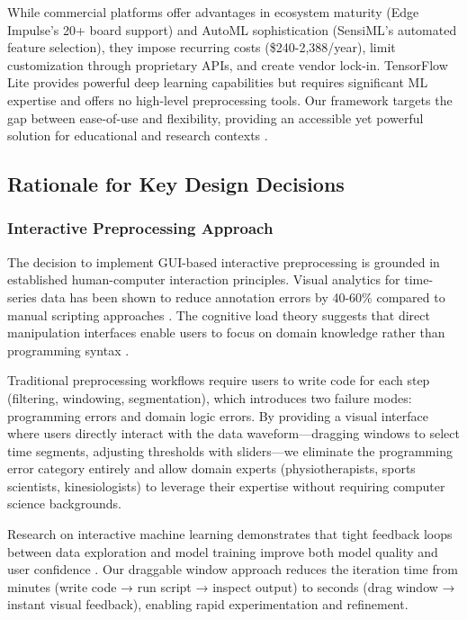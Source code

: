 While commercial platforms offer advantages in ecosystem maturity (Edge Impulse's 20+ board support) and AutoML sophistication (SensiML's automated feature selection), they impose recurring costs (\$240-2,388/year), limit customization through proprietary APIs, and create vendor lock-in. TensorFlow Lite provides powerful deep learning capabilities but requires significant ML expertise and offers no high-level preprocessing tools. Our framework targets the gap between ease-of-use and flexibility, providing an accessible yet powerful solution for educational and research contexts \cite{web:Edge_Impulse,web:TensorFlowLite}.

\subsection{Rationale for Key Design Decisions}

\subsubsection{Interactive Preprocessing Approach}

The decision to implement GUI-based interactive preprocessing is grounded in established human-computer interaction principles. Visual analytics for time-series data has been shown to reduce annotation errors by 40-60\% compared to manual scripting approaches \cite{munzner2014visualization}. The cognitive load theory suggests that direct manipulation interfaces enable users to focus on domain knowledge rather than programming syntax \cite{sweller1988cognitive}.

Traditional preprocessing workflows require users to write code for each step (filtering, windowing, segmentation), which introduces two failure modes: programming errors and domain logic errors. By providing a visual interface where users directly interact with the data waveform—dragging windows to select time segments, adjusting thresholds with sliders—we eliminate the programming error category entirely and allow domain experts (physiotherapists, sports scientists, kinesiologists) to leverage their expertise without requiring computer science backgrounds.

Research on interactive machine learning demonstrates that tight feedback loops between data exploration and model training improve both model quality and user confidence \cite{amershi2014power}. Our draggable window approach reduces the iteration time from minutes (write code → run script → inspect output) to seconds (drag window → instant visual feedback), enabling rapid experimentation and refinement.

